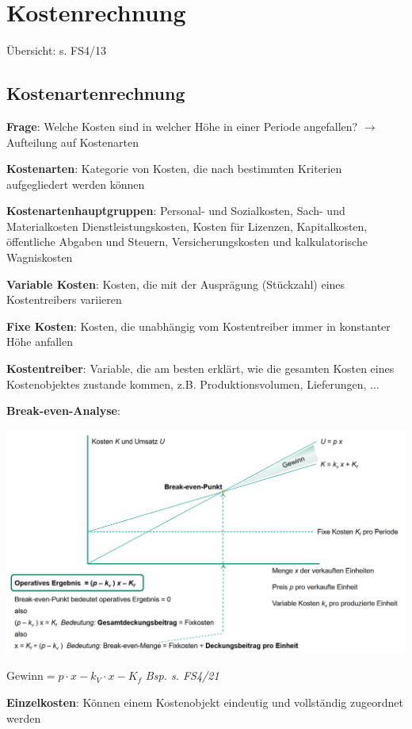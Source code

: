 \section{Kostenrechnung}
Übersicht: s. FS4/13
\subsection{Kostenartenrechnung}
\textbf{Frage}: Welche Kosten sind in welcher Höhe in einer Periode angefallen? 
$\rightarrow$ Aufteilung auf Kostenarten

\textbf{Kostenarten}: Kategorie von Kosten, die nach bestimmten Kriterien aufgegliedert werden können

\textbf{Kostenartenhauptgruppen}: Personal- und Sozialkosten, Sach- und Materialkosten
Dienstleistungskosten, Kosten für Lizenzen, Kapitalkosten, öffentliche Abgaben und Steuern, Versicherungskosten und kalkulatorische Wagniskosten

\textbf{Variable Kosten}: Kosten, die mit der Ausprägung (Stückzahl) eines Kostentreibers variieren

\textbf{Fixe Kosten}: Kosten, die unabhängig vom Kostentreiber immer in konstanter Höhe anfallen

\textbf{Kostentreiber}: Variable, die am besten erklärt, wie die gesamten Kosten eines Kostenobjektes zustande kommen, z.B. Produktionsvolumen, Lieferungen, $\ldots$

\textbf{Break-even-Analyse}:
\begin{center}
	\includegraphics[width=\textwidth]{images/be-analyse.png}
\end{center}
$\text{Gewinn}=p\cdot x-k_V\cdot x-K_f$ \qquad\qquad\qquad\qquad\qquad\qquad\textit{Bsp. s. FS4/21}
\bigskip

\textbf{Einzelkosten}: Können einem Kostenobjekt eindeutig und vollständig zugeordnet werden

